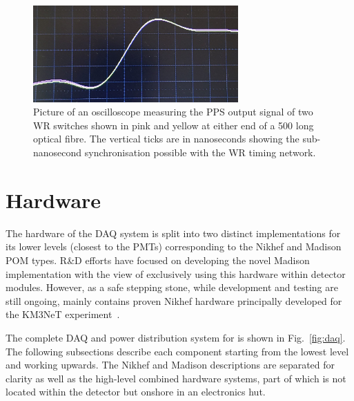 \begin{figure} %
    \includegraphics[width=0.7\textwidth]{diagrams/5-daq/sync.jpg}
    \caption[Picture of White Rabbit timing synchronisation seen in \chips.]
    {Picture of an oscilloscope measuring the PPS output signal of two WR switches shown in pink
        and yellow at either end of a \unit{500}{} long optical fibre. The vertical
        ticks are in nanoseconds showing the sub-nanosecond synchronisation possible with the WR
        timing network.}
    \label{fig:sync}
\end{figure}

\section{Hardware} %
\label{sec:daq_hard} %

The hardware of the \chipsfive DAQ system is split into two distinct implementations for its lower
levels (closest to the PMTs) corresponding to the Nikhef and Madison POM types. \chips R\&D
efforts have focused on developing the novel Madison implementation with the view of exclusively
using this hardware within detector modules. However, as a safe stepping stone, while development
and testing are still ongoing, \chipsfive mainly contains proven Nikhef hardware principally
developed for the KM3NeT experiment~\cite{adrian2016}.

The complete DAQ and power distribution system for \chipsfive is shown in Fig.~\ref{fig:daq}. The
following subsections describe each component starting from the lowest level and working upwards.
The Nikhef and Madison descriptions are separated for clarity as well as the high-level combined
hardware systems, part of which is not located within the detector but onshore in an electronics
hut.

